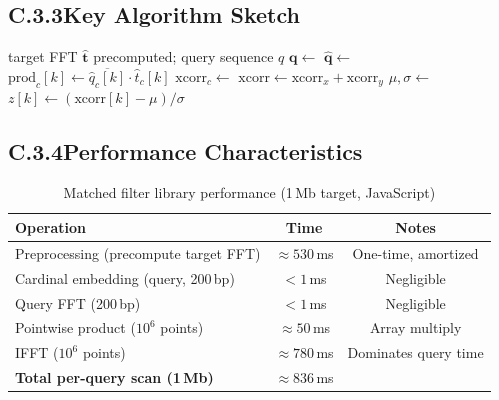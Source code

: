 \subsection*{C.3.3\quad Key Algorithm Sketch}

\begin{algorithm}
\caption{MatchedFilter.query (JavaScript pseudocode)}
\label{alg:mf_query}
\begin{algorithmic}[1]
\Require target FFT $\hat{\mathbf{t}}$ precomputed; query sequence $q$
\State $\mathbf{q} \gets$  
\State $\hat{\mathbf{q}} \gets$ 
  \State $\text{prod}_c[k] \gets \overline{\hat{q}_c[k]} \cdot \hat{t}_c[k]$ 
  \State $\text{xcorr}_c \gets$ 
\EndFor
\State $\text{xcorr} \gets \text{xcorr}_x + \text{xcorr}_y$ 
\State $\mu, \sigma \gets$ 
\State $z[k] \gets (\text{xcorr}[k] - \mu) / \sigma$ 
\State \Return {} 
\end{algorithmic}
\end{algorithm}

\subsection*{C.3.4\quad Performance Characteristics}

\begin{table}[H]
\centering
\caption{Matched filter library performance (1\,Mb target, JavaScript)}
\label{tab:mf_performance}
\begin{tabular}{lcc}
\toprule
Operation & Time & Notes \\
\midrule
Preprocessing (precompute target FFT) & $\approx 530$\,ms & One-time, amortized \\
Cardinal embedding (query, 200\,bp)   & $< 1$\,ms         & Negligible \\
Query FFT (200\,bp)                   & $< 1$\,ms         & Negligible \\
Pointwise product ($10^6$ points)     & $\approx 50$\,ms  & Array multiply \\
IFFT ($10^6$ points)                  & $\approx 780$\,ms & Dominates query time \\
\textbf{Total per-query scan (1\,Mb)} & $\approx 836$\,ms & \\
\bottomrule
\end{tabular}
\end{table}

